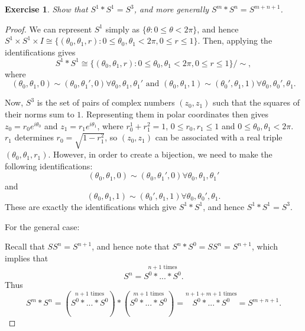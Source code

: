 \documentclass{article}
\newtheorem{exercise}[theorem]{Exercise}
\begin{document}
\begin{exercise}
Show that $S^1*S^1=S^3$, and more generally $S^m*S^n=S^{m+n+1}$.
\end{exercise}
\begin{proof}
We can represent $S^1$ simply as $\{\theta:0\leq\theta<2\pi\}$, and hence $S^1\times S^1\times I\cong \{(\theta_0,\theta_1,r):0\leq\theta_0,\theta_1<2\pi,0\leq r\leq 1\}$. Then, applying the identifications gives\[S^1*S^1\cong\{(\theta_0,\theta_1,r):0\leq\theta_0,\theta_1<2\pi,0\leq r\leq 1\}/\sim,\]where\[(\theta_0,\theta_1,0)\sim(\theta_0,\theta_1',0)\forall \theta_0,\theta_1,\theta_1'\text{ and }(\theta_0,\theta_1,1)\sim(\theta_0',\theta_1,1)\forall \theta_0,\theta_0',\theta_1.\]

Now, $S^3$ is the set of pairs of complex numbers $(z_0,z_1)$ such that the squares of their norms sum to $1$. Representing them in polar coordinates then gives $z_0=r_0 e^{i\theta_0}$ and $z_1=r_1e^{i\theta_1}$, where $r_0^1+r_1^2=1$, $0\leq r_0,r_1\leq 1$ and $0\leq\theta_0,\theta_1<2\pi$. $r_1$ determines $r_0=\sqrt{1-r_1^2}$, so $(z_0,z_1)$ can be associated with a real triple $(\theta_0,\theta_1,r_1)$. However, in order to create a bijection, we need to make the following identifications:\[(\theta_0,\theta_1,0)\sim(\theta_0,\theta_1',0)\forall \theta_0,\theta_1,\theta_1'\] and \[(\theta_0,\theta_1,1)\sim(\theta_0',\theta_1,1)\forall\theta_0,\theta_0',\theta_1.\] These are exactly the identifications which give $S^1*S^1$, and hence $S^1*S^1=S^3$.
\newline

For the general case:

\noindent Recall that $SS^n=S^{n+1}$, and hence note that $S^n*S^0=SS^n=S^{n+1}$, which implies that \[S^n=\overset{n+1\text{ times}}{S^0*...*S^0}.\] Thus \[S^m*S^n=(\overset{n+1\text{ times}}{S^0*...*S^0})*(\overset{m+1\text{ times}}{S^0*...*S^0})=\overset{n+1+m+1\text{ times}}{S^0*...*S^0}=S^{m+n+1}.\]
\end{proof}
\end{document}

